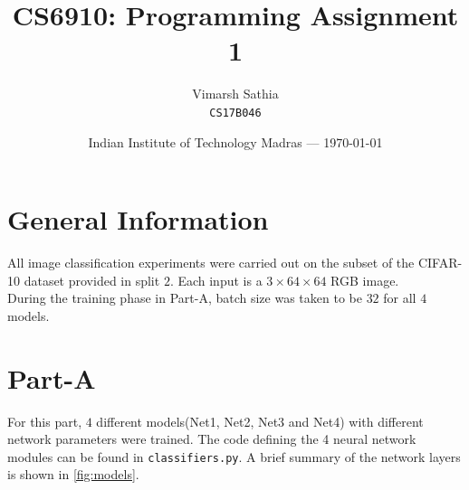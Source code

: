 \documentclass{article}
\title{CS6910: Programming Assignment 1} %
\author{Vimarsh Sathia\\ \texttt{CS17B046}} %
\date{Indian Institute of Technology Madras --- \today} %
\begin{document}
\maketitle %

\section*{General Information}
All image classification experiments were carried out on the subset of the CIFAR-10 dataset provided in split $2$. Each input is a $3 \times 64 \times 64$ RGB image.\\
During the training phase in Part-A, batch size was taken to be $32$ for all $4$ models.

\section{Part-A}
For this part, $4$ different models(Net1, Net2, Net3 and Net4) with different network parameters were trained. The code defining the 4 neural network modules can be found in \lstinline!classifiers.py!. A brief summary of the network layers is shown in \cref{fig:models}.
\end{document}
